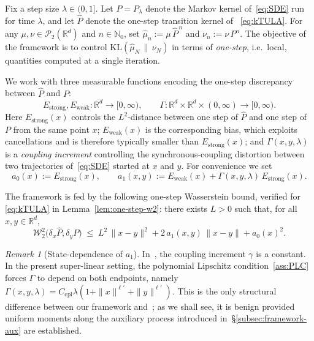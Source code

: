 \documentclass[11pt,a4paper,reqno]{amsart}
\theoremstyle{plain}
\theoremstyle{definition}
\theoremstyle{remark}
\newtheorem{remark}{Remark}
\newcommand{\R}{\mathbb{R}}
\newcommand{\KL}{\mathrm{KL}}
\newcommand{\W}{\mathcal{W}_2}
\begin{document}
Fix a step size $\lambda\in(0,1]$. Let $P=P_\lambda$ denote the Markov
kernel of~\eqref{eq:SDE} run for time $\lambda$,
and let $\widehat P$ denote the one-step transition kernel of
~\eqref{eq:kTULA}. For any $\mu,\nu\in\mathcal{P}_2(\R^d)$
and $n\in\mathbb{N}_0$, set $\widehat\mu_n := \mu\,\widehat P^{\,n}$ and
$\nu_n := \nu\,P^{n}$.
The objective of the framework is to control
$\KL(\widehat\mu_N\,\|\,\nu_N)$ in terms of \emph{one-step}, i.e.\ local,
quantities computed at a single iteration.

We work with three measurable functions encoding the one-step
discrepancy between $\widehat P$ and $P$:
\[
  E_{\mathrm{strong}}, E_{\mathrm{weak}}\colon\R^d\to[0,\infty),
  \qquad
  \Gamma\colon\R^d\times\R^d\times(0,\infty)\to[0,\infty).
\]
Here $E_{\mathrm{strong}}(x)$ controls the $L^2$-distance between
one step of $\widehat P$ and one step of $P$ from the same point $x$;
$E_{\mathrm{weak}}(x)$ is the corresponding bias, which exploits
cancellations and is therefore typically smaller than
$E_{\mathrm{strong}}(x)$; and $\Gamma(x,y,\lambda)$ is a
\emph{coupling increment} controlling the synchronous-coupling
distortion between two trajectories of~\eqref{eq:SDE} started at $x$ and $y$.
For convenience we set
\begin{equation}\label{eq:framework-a0a1}
  a_0(x):=E_{\mathrm{strong}}(x),
  \qquad
  a_1(x,y):=E_{\mathrm{weak}}(x)+\Gamma(x,y,\lambda)\,E_{\mathrm{strong}}(x).
\end{equation}

The framework is fed by the following one-step Wasserstein bound,
verified for \ref{eq:kTULA} in Lemma~\ref{lem:one-step-w2}: there
exists $L>0$ such that, for all $x,y\in\R^d$,
\begin{equation}\label{eq:one-step-w2-framework}
  \W^{2}\!\bigl(\delta_x\widehat P,\delta_y P\bigr)
  \;\le\;
  L^{2}\,\|x-y\|^{2}
  +2\,a_1(x,y)\,\|x-y\|
  +a_0(x)^{2}.
\end{equation}

\begin{remark}[State-dependence of $a_1$]
\label{rem:state-dependence}
In~\cite{chewi2024local}, the coupling increment $\gamma$ is a constant. In the present
super-linear setting, the polynomial Lipschitz
condition~\ref{ass:PLC} forces $\Gamma$ to depend on both endpoints,
namely $\Gamma(x,y,\lambda)=C_{\mathrm{cpl}}\lambda(1+\|x\|^{\ell'}+\|y\|^{\ell'})$.
This is the only structural difference between our framework
and~\cite{chewi2024local}; as we shall see, it is benign provided
uniform moments along the auxiliary process introduced
in~\S\ref{subsec:framework-aux} are established.
\end{remark}
\end{document}
